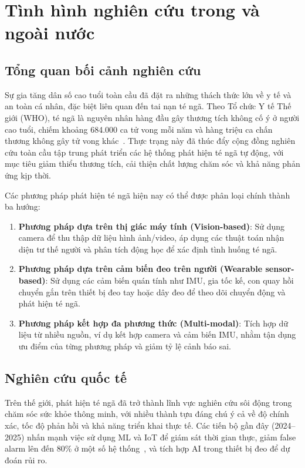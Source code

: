 \section{Tình hình nghiên cứu trong và ngoài nước}

\subsection{Tổng quan bối cảnh nghiên cứu}
Sự gia tăng dân số cao tuổi toàn cầu đã đặt ra những thách thức lớn về y tế và an toàn cá nhân, đặc biệt liên quan đến tai nạn té ngã. Theo Tổ chức Y tế Thế giới (WHO), té ngã là nguyên nhân hàng đầu gây thương tích không cố ý ở người cao tuổi, chiếm khoảng 684.000 ca tử vong mỗi năm và hàng triệu ca chấn thương không gây tử vong khác~\cite{who2021}. Thực trạng này đã thúc đẩy cộng đồng nghiên cứu toàn cầu tập trung phát triển các hệ thống phát hiện té ngã tự động, với mục tiêu giảm thiểu thương tích, cải thiện chất lượng chăm sóc và khả năng phản ứng kịp thời.

Các phương pháp phát hiện té ngã hiện nay có thể được phân loại chính thành ba hướng:  
\begin{enumerate}
    \item \textbf{Phương pháp dựa trên thị giác máy tính (Vision-based)}: Sử dụng camera để thu thập dữ liệu hình ảnh/video, áp dụng các thuật toán nhận diện tư thế người và phân tích động học để xác định tình huống té ngã.  
    \item \textbf{Phương pháp dựa trên cảm biến đeo trên người (Wearable sensor-based)}: Sử dụng các cảm biến quán tính như IMU, gia tốc kế, con quay hồi chuyển gắn trên thiết bị đeo tay hoặc dây đeo để theo dõi chuyển động và phát hiện té ngã.  
    \item \textbf{Phương pháp kết hợp đa phương thức (Multi-modal)}: Tích hợp dữ liệu từ nhiều nguồn, ví dụ kết hợp camera và cảm biến IMU, nhằm tận dụng ưu điểm của từng phương pháp và giảm tỷ lệ cảnh báo sai.
\end{enumerate}

\subsection{Nghiên cứu quốc tế}
Trên thế giới, phát hiện té ngã đã trở thành lĩnh vực nghiên cứu sôi động trong chăm sóc sức khỏe thông minh, với nhiều thành tựu đáng chú ý cả về độ chính xác, tốc độ phản hồi và khả năng triển khai thực tế. Các tiến bộ gần đây (2024--2025) nhấn mạnh việc sử dụng ML và IoT để giám sát thời gian thực, giảm false alarm lên đến 80\% ở một số hệ thống~\cite{international2024}, và tích hợp AI trong thiết bị đeo để dự đoán rủi ro.

